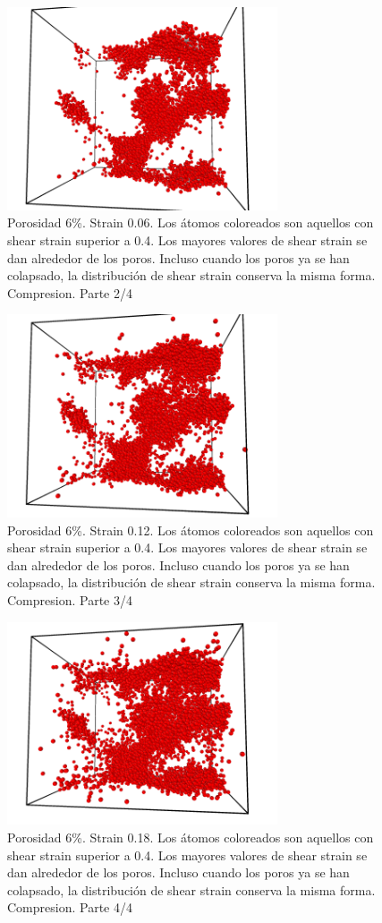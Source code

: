 \documentclass[10pt, oneside]{article} %
\begin{document}
\begin{figure}[H]
\centering
\includegraphics[width=8cm]{Figures/Porosidad/porosidad_6_shearstrain04_006.png}
\caption{Porosidad 6\%. Strain 0.06. Los átomos coloreados son aquellos con shear strain superior a 0.4. Los mayores valores de shear strain se dan alrededor de los poros. Incluso cuando los poros ya se han colapsado, la distribución de shear strain conserva la misma forma. Compresion. Parte 2/4}
\end{figure}

\begin{figure}[H]
\centering
\includegraphics[width=8cm]{Figures/Porosidad/porosidad_6_shearstrain04_012.png}
\caption{Porosidad 6\%. Strain 0.12. Los átomos coloreados son aquellos con shear strain superior a 0.4. Los mayores valores de shear strain se dan alrededor de los poros. Incluso cuando los poros ya se han colapsado, la distribución de shear strain conserva la misma forma. Compresion. Parte 3/4}
\end{figure}

\begin{figure}[H]
\centering
\includegraphics[width=8cm]{Figures/Porosidad/porosidad_6_shearstrain04_018.png}
\caption{Porosidad 6\%. Strain 0.18. Los átomos coloreados son aquellos con shear strain superior a 0.4. Los mayores valores de shear strain se dan alrededor de los poros. Incluso cuando los poros ya se han colapsado, la distribución de shear strain conserva la misma forma. Compresion. Parte 4/4}
\end{figure}
\end{document}

